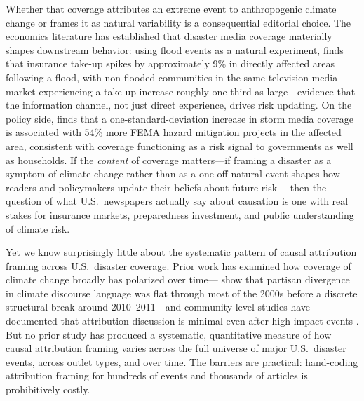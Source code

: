 \documentclass[12pt]{article}
\begin{document}
Whether that coverage attributes an extreme event to anthropogenic
climate change or frames it as natural variability is a consequential
editorial choice.  The economics literature has established that
disaster media coverage materially shapes downstream behavior: using
flood events as a natural experiment, \citet{gallagher2014} finds that
insurance take-up spikes by approximately 9\% in directly affected
areas following a flood, with non-flooded communities in the same
television media market experiencing a take-up increase roughly
one-third as large---evidence that the information channel, not just
direct experience, drives risk updating.  On the policy side,
\citet{magontier2020} finds that a one-standard-deviation increase in
storm media coverage is associated with 54\% more FEMA hazard
mitigation projects in the affected area, consistent with coverage
functioning as a risk signal to governments as well as households.  If
the \emph{content} of coverage matters---if framing a disaster as a
symptom of climate change rather than as a one-off natural event shapes
how readers and policymakers update their beliefs about future risk---
then the question of what U.S.\ newspapers actually say about
causation is one with real stakes for insurance markets, preparedness
investment, and public understanding of climate risk.

Yet we know surprisingly little about the systematic pattern of causal
attribution framing across U.S.\ disaster coverage.  Prior work has
examined how coverage of climate change broadly has polarized over
time---\citet{chinn2020} show that partisan divergence in climate
discourse language was flat through most of the 2000s before a discrete
structural break around 2010--2011---and community-level studies have
documented that attribution discussion is minimal even after high-impact
events \citep{boudet2020}.  But no prior study has produced a
systematic, quantitative measure of how causal attribution framing
varies across the full universe of major U.S.\ disaster events, across
outlet types, and over time.  The barriers are practical: hand-coding
attribution framing for hundreds of events and thousands of articles is
prohibitively costly.
\end{document}
